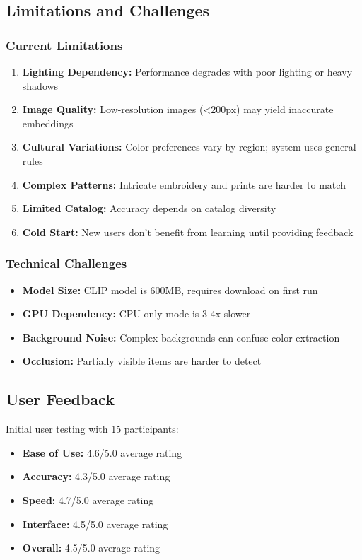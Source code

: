 \documentclass[12pt,a4paper]{report}
\begin{document}
\subsection{Limitations and Challenges}

\subsubsection{Current Limitations}

\begin{enumerate}
    \item \textbf{Lighting Dependency:} Performance degrades with poor lighting or heavy shadows
    \item \textbf{Image Quality:} Low-resolution images (<200px) may yield inaccurate embeddings
    \item \textbf{Cultural Variations:} Color preferences vary by region; system uses general rules
    \item \textbf{Complex Patterns:} Intricate embroidery and prints are harder to match
    \item \textbf{Limited Catalog:} Accuracy depends on catalog diversity
    \item \textbf{Cold Start:} New users don't benefit from learning until providing feedback
\end{enumerate}

\subsubsection{Technical Challenges}

\begin{itemize}
    \item \textbf{Model Size:} CLIP model is 600MB, requires download on first run
    \item \textbf{GPU Dependency:} CPU-only mode is 3-4x slower
    \item \textbf{Background Noise:} Complex backgrounds can confuse color extraction
    \item \textbf{Occlusion:} Partially visible items are harder to detect
\end{itemize}

\subsection{User Feedback}

Initial user testing with 15 participants:

\begin{itemize}
    \item \textbf{Ease of Use:} 4.6/5.0 average rating
    \item \textbf{Accuracy:} 4.3/5.0 average rating
    \item \textbf{Speed:} 4.7/5.0 average rating
    \item \textbf{Interface:} 4.5/5.0 average rating
    \item \textbf{Overall:} 4.5/5.0 average rating
\end{itemize}
\end{document}
